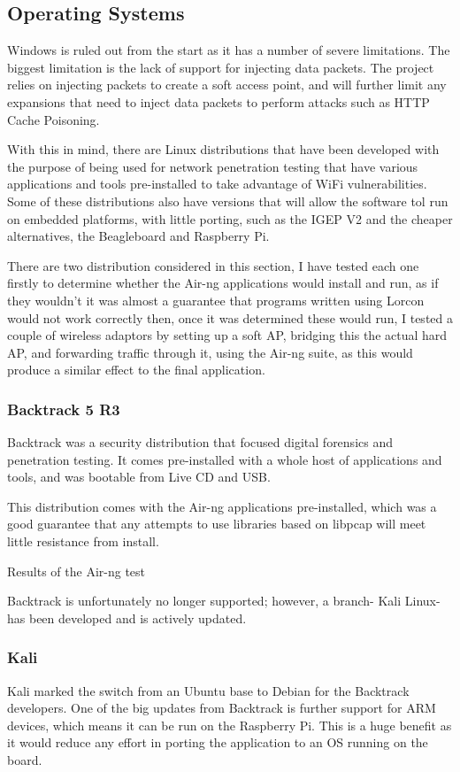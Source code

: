 \subsection{Operating Systems}
Windows is ruled out from the start as it has a number of severe limitations. The biggest limitation is the lack of support for injecting data packets. The project relies on injecting packets to create a soft access point, and will further limit any expansions that need to inject data packets to perform attacks such as HTTP Cache Poisoning.

With this in mind, there are Linux distributions that have been developed with the purpose of being used for network penetration testing that have various applications and tools pre-installed to take advantage of WiFi vulnerabilities. Some of these distributions also have versions that will allow the software tol run on embedded platforms, with little porting, such as the IGEP V2 and the cheaper alternatives, the Beagleboard and Raspberry Pi.

There are two distribution considered in this section, I have tested each one firstly to determine whether the Air-ng applications would install and run, as if they wouldn’t it was almost a guarantee that programs written using Lorcon would not work correctly then, once it was determined these would run, I tested a couple of wireless adaptors by setting up a soft AP, bridging this the actual hard AP, and forwarding traffic through it, using the Air-ng suite, as this would produce a similar effect to the final application.

\subsubsection{Backtrack 5 R3}
Backtrack was a security distribution that focused digital forensics and penetration testing. It comes pre-installed with a whole host of applications and tools, and was bootable from Live CD and USB. 

This distribution comes with the Air-ng applications pre-installed, which was a good guarantee that any attempts to use libraries based on libpcap will meet little resistance from install.

Results of the Air-ng test

Backtrack is unfortunately no longer supported; however, a branch- Kali Linux- has been developed and is actively updated.
\subsubsection{Kali}
Kali marked the switch from an Ubuntu base to Debian for the Backtrack developers. One of the big updates from Backtrack is further support for ARM devices, which means it can be run on the Raspberry Pi. This is a huge benefit as it would reduce any effort in porting the application to an OS running on the board.

